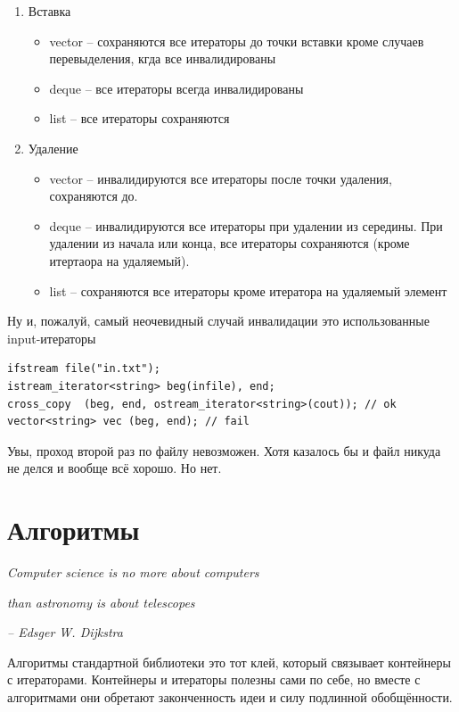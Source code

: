 \documentclass[a4paper,12pt,oneside]{book}
\begin{document}
\begin{enumerate}
\item Вставка
\begin{itemize}
\item vector -- сохраняются все итераторы до точки вставки кроме случаев перевыделения, кгда все инвалидированы
\item deque -- все итераторы всегда инвалидированы
\item list -- все итераторы сохраняются
\end{itemize}
\item Удаление
\begin{itemize}
\item vector – инвалидируются все итераторы после точки удаления, сохраняются до.
\item deque – инвалидируются все итераторы при удалении из середины. При удалении из начала или конца, все итераторы сохраняются (кроме итертаора на удаляемый).
\item list – сохраняются все итераторы кроме итератора на удаляемый элемент
\end{itemize}
\end{enumerate}

Ну и, пожалуй, самый неочевидный случай инвалидации это использованные input-итераторы

\begin{lstlisting}
ifstream file("in.txt");
istream_iterator<string> beg(infile), end;
cross_copy  (beg, end, ostream_iterator<string>(cout)); // ok
vector<string> vec (beg, end); // fail
\end{lstlisting}

Увы, проход второй раз по файлу невозможен. Хотя казалось бы и файл никуда не делся и вообще всё хорошо. Но нет.

\pagebreak
\section{Алгоритмы}

\hfill\textit{Computer science is no more about computers}

\hfill\textit{than astronomy is about telescopes}{\vspace{0.5em}}

\hfill\textit{-- Edsger W. Dijkstra}

Алгоритмы стандартной библиотеки это тот клей, который связывает контейнеры с итераторами. Контейнеры и итераторы полезны сами по себе, но вместе с алгоритмами они обретают законченность идеи и силу подлинной обобщённости.
\end{document}
